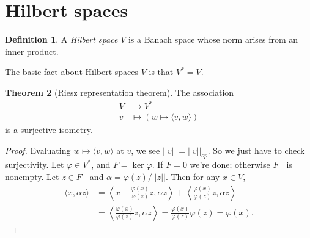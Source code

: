 \documentclass[12pt]{report}
\newcommand{\dfn}[1]{\emph{#1}\index{#1}}
\theoremstyle{definition}
\newtheorem{theorem}{Theorem}[chapter]
\newtheorem{definition}[theorem]{Definition}
\begin{document}
\section{Hilbert spaces}
    \begin{definition}
    A \dfn{Hilbert space} $V$ is a Banach space whose norm arises from an inner product.
    \end{definition}
    The basic fact about Hilbert spaces $V$ is that $V^* = V$.
\begin{theorem}[Riesz representation theorem]
    The association
\begin{align*}
    V &\to V^*\\
    v &\mapsto (w \mapsto \langle v, w\rangle)
\end{align*}
    is a surjective isometry.
\end{theorem}
\begin{proof}
    Evaluating $w \mapsto \langle v, w\rangle$ at $v$, we see $||v|| = ||v||_{op}$. So we just have to check surjectivity. Let $\varphi \in V^*$, and $F = \ker \varphi$. If $F = 0$ we're done; otherwise $F^\perp$ is nonempty. Let $z \in F^\perp$ and $\alpha = \varphi(z)/||z||$. Then for any $x \in V$,
    \begin{align*}
        \langle x, \alpha z\rangle  &=  \left\langle x - \frac{\varphi(x)}{\varphi(z)} z, \alpha z\right\rangle + \left\langle \frac{\varphi(x)}{\varphi(z)}z, \alpha z\right\rangle \\&= \left\langle \frac{\varphi(x)}{\varphi(z)}z, \alpha z\right\rangle
            = \frac{\varphi(x)}{\varphi(z)} \varphi(z) = \varphi(x).
    \end{align*}
\end{proof}
\end{document}
